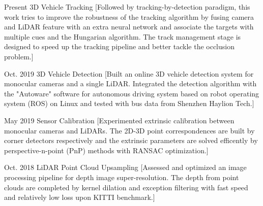 \documentclass{resume}
\begin{document}
\begin{experiences}
  \experience%
    {Present}%
    {3D Vehicle Tracking}%
    [Followed by tracking-by-detection paradigm, this work tries to improve the robustness of the tracking algorithm by fusing camera and LiDAR feature with an extra neural network and associate the targets with multiple cues and the Hungarian algorithm. The track management stage is designed to speed up the tracking pipeline and better tackle the occlusion problem.]

\separator{0.5ex}

  \experience%
    {Oct. 2019}%
    {3D Vehicle Detection}%
    [Built an online 3D vehicle detection system for monocular cameras and a single LiDAR. Integrated the detection algorithm with the "Autoware" software for autonomous driving system based on robot operating system (ROS) on Linux and tested with bus data from Shenzhen Haylion Tech.] 

\separator{0.5ex}

  \experience%
    {May 2019}%
    {Sensor Calibration}%
    [Experimented extrinsic calibration between monocular cameras and LiDARs. The 2D-3D point correspondences are built by corner detectors respectively and the extrinsic parameters are solved efficently by perspective-n-point (PnP) methods with RANSAC optimization.]

\separator{0.5ex}

  \experience%
    {Oct. 2018}%
    {LiDAR Point Cloud Upsampling}%
    [Assessed and optimized an image processing pipeline for depth image super-resolution. The depth from point clouds are completed by kernel dilation and exception filtering with fast speed and relatively low loss upon KITTI benchmark.]   
    

\end{experiences}

\begin{competences}[12em]
\end{competences}
\end{document}
